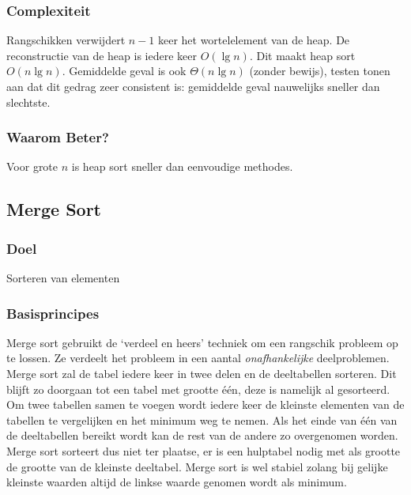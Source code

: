 \documentclass{article}
\begin{document}
\subsubsection{Complexiteit} %
\label{sub:heap_sort_heap_sort_complexiteit}
Rangschikken verwijdert $n-1$ keer het wortelelement van de heap. De reconstructie van de heap is iedere keer $O(\lg n)$. Dit maakt heap sort $O(n\lg n)$.
Gemiddelde geval is ook $\Theta(n\lg n)$ (zonder bewijs), testen tonen aan dat dit gedrag zeer consistent is: gemiddelde geval nauwelijks sneller dan slechtste.

\subsubsection{Waarom Beter?} %
\label{sub:heap_sort_waarom_beter}
Voor grote $n$ is heap sort sneller dan eenvoudige methodes.

\subsection{Merge Sort} %
\label{sub:merge_sort}
\subsubsection{Doel} %
\label{sub:merge_sort_doel}
Sorteren van elementen

\subsubsection{Basisprincipes} %
\label{sub:merge_sort_merge_sort_basisprincipes}
Merge sort gebruikt de `verdeel en heers' techniek om een rangschik probleem op te lossen. Ze verdeelt het probleem in een aantal \textit{onafhankelijke} deelproblemen. Merge sort zal de tabel iedere keer in twee delen en de deeltabellen sorteren. Dit blijft zo doorgaan tot een tabel met grootte één, deze is namelijk al gesorteerd. Om twee tabellen samen te voegen wordt iedere keer de kleinste elementen van de tabellen te vergelijken en het minimum weg te nemen. Als het einde van één van de deeltabellen bereikt wordt kan de rest van de andere zo overgenomen worden. Merge sort sorteert dus niet ter plaatse, er is een hulptabel nodig met als grootte de grootte van de kleinste deeltabel. Merge sort is wel stabiel zolang bij gelijke kleinste waarden altijd de linkse waarde genomen wordt als minimum.
\end{document}

